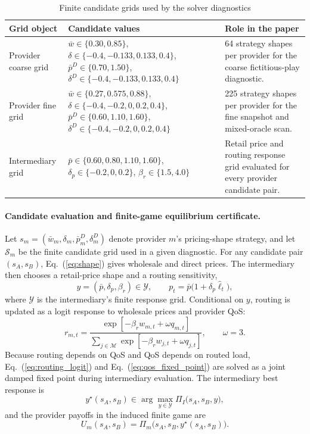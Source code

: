 \documentclass[11pt,a4paper]{article}
\newcommand{\M}{\mathcal{M}}
\begin{document}
\begin{table}[H]
\centering
\caption{Finite candidate grids used by the solver diagnostics}
\label{tab:solver_grids}
\small
\begin{tabular}{p{}p{}p{}}
\toprule
Grid object & Candidate values & Role in the paper \\
\midrule
Provider coarse grid &
$\bar w\in\{0.30,0.85\}$, $\delta\in\{-0.4,-0.133,0.133,0.4\}$, $\bar p^D\in\{0.70,1.50\}$, $\delta^D\in\{-0.4,-0.133,0.133,0.4\}$ &
64 strategy shapes per provider for the coarse fictitious-play diagnostic. \\
Provider fine grid &
$\bar w\in\{0.27,0.575,0.88\}$, $\delta\in\{-0.4,-0.2,0,0.2,0.4\}$, $\bar p^D\in\{0.60,1.10,1.60\}$, $\delta^D\in\{-0.4,-0.2,0,0.2,0.4\}$ &
225 strategy shapes per provider for the fine snapshot and mixed-oracle scan. \\
Intermediary grid &
$\bar p\in\{0.60,0.80,1.10,1.60\}$, $\delta_p\in\{-0.2,0,0.2\}$, $\beta_r\in\{1.5,4.0\}$ &
Retail price and routing response grid evaluated for every provider candidate pair. \\
\bottomrule
\end{tabular}
\end{table}

\paragraph{Candidate evaluation and finite-game equilibrium certificate.}

Let $s_m=(\bar w_m,\delta_m,\bar p^D_m,\delta^D_m)$ denote provider $m$'s pricing-shape strategy, and let $\mathcal S_m$ be the finite candidate grid used in a given diagnostic. For any candidate pair $(s_A,s_B)$, Eq.~(\ref{eq:shape}) gives wholesale and direct prices. The intermediary then chooses a retail-price shape and a routing sensitivity,
\[
  y=(\bar p,\delta_p,\beta_r)\in\mathcal Y ,
  \qquad
  p_t=\bar p\big(1+\delta_p\widehat{\ell}_t\big),
\]
where $\mathcal Y$ is the intermediary's finite response grid. Conditional on $y$, routing is updated as a logit response to wholesale prices and provider QoS:
\begin{equation}
  r_{m,t}
  =
  \frac{\exp[-\beta_r w_{m,t}+\omega q_{m,t}]}
       {\sum_{j\in\M}\exp[-\beta_r w_{j,t}+\omega q_{j,t}]},
  \qquad \omega=3 .
  \label{eq:routing_logit}
\end{equation}
Because routing depends on QoS and QoS depends on routed load, Eq.~(\ref{eq:routing_logit}) and Eq.~(\ref{eq:qos_fixed_point}) are solved as a joint damped fixed point during intermediary evaluation. The intermediary best response is
\begin{equation}
  y^\star(s_A,s_B)\in
  \arg\max_{y\in\mathcal Y}
  \Pi_I\big(s_A,s_B,y\big),
  \label{eq:intermediary_best_response}
\end{equation}
and the provider payoffs in the induced finite game are
\begin{equation}
  U_m(s_A,s_B)=
  \Pi_m\big(s_A,s_B,y^\star(s_A,s_B)\big).
  \label{eq:finite_game_payoff}
\end{equation}
\end{document}
